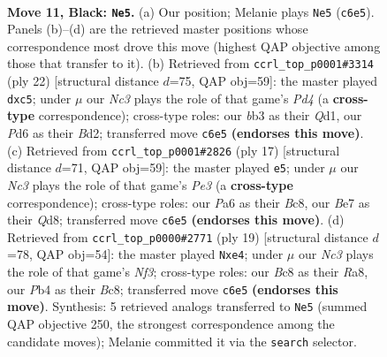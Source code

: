 \documentclass[11pt]{article}
\begin{document}
\clearpage

\begin{figure}[p]\centering
\begin{subfigure}{0.46\textwidth}\centering
\resizebox{\linewidth}{!}{%
\newchessgame
\chessboard[
  setfen={r1bq1rk1/2p1bppp/p1np1n2/8/1pPNP2P/1B6/PP3PP1/RNBQR1K1 b - - 0 11},
  showmover=false,
  pgfstyle=straightmove, color=movearrow, markmove={c6-e5}
]}
\caption{}
\end{subfigure}\hfill
\begin{subfigure}{0.46\textwidth}\centering
\resizebox{\linewidth}{!}{%
\newchessgame
\chessboard[
  setfen={rnbq1rk1/pp2bppp/4p3/2pnP3/P1pP4/2N2NP1/1P1B1PBP/R2Q1RK1 w - - 1 12},
  showmover=false,
  pgfstyle=straightmove, color=movearrow, markmove={d4-c5}
]}
\caption{}
\end{subfigure}
\\[4pt]
\begin{subfigure}{0.46\textwidth}\centering
\resizebox{\linewidth}{!}{%
\newchessgame
\chessboard[
  setfen={r1bq1rk1/pp2bppp/2nppn2/8/3NPP2/P1N1B3/1PP1B1PP/R2QK2R b KQ - 2 9},
  showmover=false,
  pgfstyle=straightmove, color=movearrow, markmove={e6-e5}
]}
\caption{}
\end{subfigure}\hfill
\begin{subfigure}{0.46\textwidth}\centering
\resizebox{\linewidth}{!}{%
\newchessgame
\chessboard[
  setfen={r1bqkb1r/5ppp/p1np1n2/3Np3/1pP1P3/8/PPN2PPP/R1BQKB1R b KQkq - 1 10},
  showmover=false,
  pgfstyle=straightmove, color=movearrow, markmove={f6-e4}
]}
\caption{}
\end{subfigure}
\caption{\textbf{Move 11, Black: \texttt{Ne5}.} (a) Our position; Melanie plays \texttt{Ne5} (\texttt{c6e5}). Panels (b)--(d) are the retrieved master positions whose correspondence most drove this move (highest QAP objective among those that transfer to it). (b) Retrieved from \texttt{ccrl\_top\_p0001\#3314} (ply 22) [structural distance $d$=75, QAP obj=59]: the master played \texttt{dxc5}; under $\mu$ our \emph{Nc3} plays the role of that game's \emph{Pd4} (a \textbf{cross-type} correspondence); cross-type roles: our \emph{b}b3 as their \emph{Q}d1, our \emph{P}d6 as their \emph{B}d2; transferred move \texttt{c6e5} \textbf{(endorses this move)}. (c) Retrieved from \texttt{ccrl\_top\_p0001\#2826} (ply 17) [structural distance $d$=71, QAP obj=59]: the master played \texttt{e5}; under $\mu$ our \emph{Nc3} plays the role of that game's \emph{Pe3} (a \textbf{cross-type} correspondence); cross-type roles: our \emph{P}a6 as their \emph{B}c8, our \emph{B}e7 as their \emph{Q}d8; transferred move \texttt{c6e5} \textbf{(endorses this move)}. (d) Retrieved from \texttt{ccrl\_top\_p0000\#2771} (ply 19) [structural distance $d$=78, QAP obj=54]: the master played \texttt{Nxe4}; under $\mu$ our \emph{Nc3} plays the role of that game's \emph{Nf3}; cross-type roles: our \emph{B}c8 as their \emph{R}a8, our \emph{P}b4 as their \emph{B}c8; transferred move \texttt{c6e5} \textbf{(endorses this move)}. Synthesis: 5 retrieved analogs transferred to \texttt{Ne5} (summed QAP objective 250, the strongest correspondence among the candidate moves); Melanie committed it via the \texttt{search} selector.}
\label{fig:thought-m21}
\end{figure}
\end{document}

